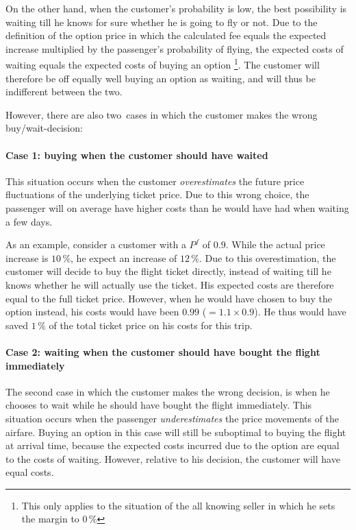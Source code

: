 On the other hand, when the customer's probability is low, the best possibility is waiting till he knows for sure whether he is going to fly or not. Due to the definition of the option price in which the calculated fee equals the expected increase multiplied by the passenger's probability of flying, the expected costs of waiting equals the expected costs of buying an option \footnote{This only applies to the situation of the all knowing seller in which he sets the margin to $0\,\%$}. The customer will therefore be off equally well buying an option as waiting, and will thus be indifferent between the two.

However, there are also two~cases in which the customer makes the wrong buy/wait-decision:

\paragraph{Case 1: buying when the customer should have waited}

This situation occurs when the customer \emph{overestimates} the future price fluctuations of the underlying ticket price. Due to this wrong choice, the passenger will on average have higher costs than he would have had when waiting a few days.

As an example, consider a customer with a $P^f$ of $0.9$. While the actual price increase is $10\,\%$, he expect an increase of $12\,\%$. Due to this overestimation, the customer will decide to buy the flight ticket directly, instead of waiting till he knows whether he will actually use the ticket. His expected costs are therefore equal to the full ticket price. However, when he would have chosen to buy the option instead, his costs would have been $0.99$ ($= 1.1 \times 0.9$). He thus would have saved $1\,\%$ of the total ticket price on his costs for this trip.

\paragraph{Case 2: waiting when the customer should have bought the flight immediately}

The second case in which the customer makes the wrong decision, is when he chooses to wait while he should have bought the flight immediately. This situation occurs when the passenger \emph{underestimates} the price movements of the airfare. Buying an option in this case will still be suboptimal to buying the flight at arrival time, because the expected costs incurred due to the option are equal to the costs of waiting. However, relative to his decision, the customer will have equal costs.

